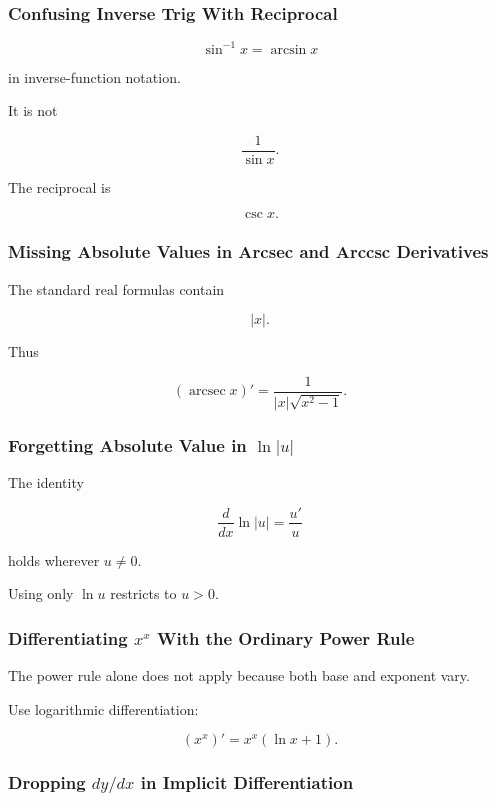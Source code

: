 \subsubsection{Confusing Inverse Trig With Reciprocal}

\[
\boxed{
\sin^{-1}x
=
\arcsin x
}
\]

in inverse-function notation.

It is not

\[
\frac1{\sin x}.
\]

The reciprocal is

\[
\boxed{
\csc x.
}
\]

\subsubsection{Missing Absolute Values in Arcsec and Arccsc Derivatives}

The standard real formulas contain

\[
\boxed{
|x|.
}
\]

Thus

\[
\boxed{
(\operatorname{arcsec}x)'
=
\frac1{|x|\sqrt{x^2-1}}.
}
\]

\subsubsection{Forgetting Absolute Value in \(\ln|u|\)}

The identity

\[
\boxed{
\frac{d}{dx}
\ln|u|
=
\frac{u'}{u}
}
\]

holds wherever \(u\neq0\).

Using only \(\ln u\) restricts to \(u>0\).

\subsubsection{Differentiating \(x^x\) With the Ordinary Power Rule}

The power rule alone does not apply because both base and exponent vary.

Use logarithmic differentiation:

\[
\boxed{
(x^x)'
=
x^x(\ln x+1).
}
\]

\subsubsection{Dropping \(dy/dx\) in Implicit Differentiation}

